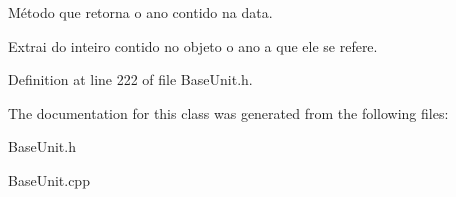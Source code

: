 Método que retorna o ano contido na data. 

Extrai do inteiro contido no objeto o ano a que ele se refere. 

Definition at line 222 of file Base\-Unit.\-h.



The documentation for this class was generated from the following files\-:\begin{DoxyCompactItemize}
\item 
Base\-Unit.\-h\item 
Base\-Unit.\-cpp\end{DoxyCompactItemize}
